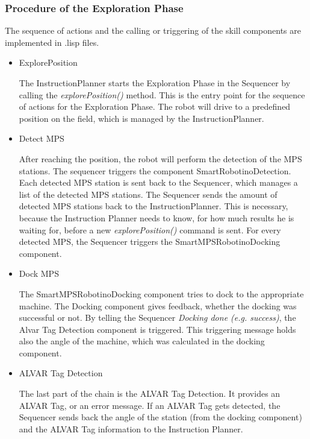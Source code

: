 \subsubsection{Procedure of the Exploration Phase}

The sequence of actions and the calling or triggering of the skill components are implemented in .lisp files.

\begin{itemize}

\item ExplorePosition

The InstructionPlanner starts the Exploration Phase in the Sequencer by calling the \textit{explorePosition()} method. This is the entry point for the sequence of actions for the Exploration Phase. The robot will drive to a predefined position on the field, which is managed by the InstructionPlanner.  

\item Detect MPS

After reaching the position, the robot will perform the detection of the MPS stations. The sequencer triggers the component SmartRobotinoDetection.
Each detected MPS station is sent back to the Sequencer, which manages a list of the detected MPS stations. 
The Sequencer sends the amount of detected MPS stations back to the InstructionPlanner. This is necessary, because the Instruction Planner needs to know, for how much results he is waiting for, before a new \textit{explorePosition()} command is sent.
For every detected MPS, the Sequencer triggers the SmartMPSRobotinoDocking component.

\item Dock MPS

The SmartMPSRobotinoDocking component tries to dock to the appropriate machine. 
The Docking component gives feedback, whether the docking was successful or not. By telling the Sequencer \textit{Docking done (e.g. success)}, the Alvar Tag Detection component is triggered. This triggering message holds also the angle of the machine, which was calculated in the docking component.

\item ALVAR Tag Detection

The last part of the chain is the ALVAR Tag Detection. It provides an ALVAR Tag, or an error message. 
If an ALVAR Tag gets detected, the Sequencer sends back the angle of the station (from the docking component) and the ALVAR Tag information to the Instruction Planner.

\end{itemize}

